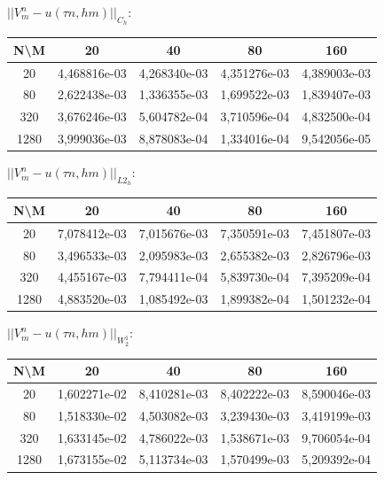 \documentclass[a4paper, 11pt]{article}
\begin{document}
$||V_m^n - u (\tau n, hm)||_{C_h}$:
\begin{center}
\begin{tabular}{|c|c|c|c|c|}
\hline 
 N\textbackslash M &      20      &      40      &      80      &     160      \\ 
 \hline 
        20         & 4,468816e-03 & 4,268340e-03 & 4,351276e-03 & 4,389003e-03 \\ 
 \hline 
        80         & 2,622438e-03 & 1,336355e-03 & 1,699522e-03 & 1,839407e-03 \\ 
 \hline 
        320        & 3,676246e-03 & 5,604782e-04 & 3,710596e-04 & 4,832500e-04 \\ 
 \hline 
       1280        & 3,999036e-03 & 8,878083e-04 & 1,334016e-04 & 9,542056e-05 \\ 
 \hline 
\end{tabular}
\end{center}
$||V_m^n - u (\tau n, hm)||_{L2_h}$:
\begin{center}
\begin{tabular}{|c|c|c|c|c|}
\hline 
 N\textbackslash M &      20      &      40      &      80      &     160      \\ 
 \hline 
        20         & 7,078412e-03 & 7,015676e-03 & 7,350591e-03 & 7,451807e-03 \\ 
 \hline 
        80         & 3,496533e-03 & 2,095983e-03 & 2,655382e-03 & 2,826796e-03 \\ 
 \hline 
        320        & 4,455167e-03 & 7,794411e-04 & 5,839730e-04 & 7,395209e-04 \\ 
 \hline 
       1280        & 4,883520e-03 & 1,085492e-03 & 1,899382e-04 & 1,501232e-04 \\ 
 \hline 
\end{tabular}
\end{center}
$||V_m^n - u (\tau n, hm)||_{W_2^1}$:
\begin{center}
\begin{tabular}{|c|c|c|c|c|}
\hline 
 N\textbackslash M &      20      &      40      &      80      &     160      \\ 
 \hline 
        20         & 1,602271e-02 & 8,410281e-03 & 8,402222e-03 & 8,590046e-03 \\ 
 \hline 
        80         & 1,518330e-02 & 4,503082e-03 & 3,239430e-03 & 3,419199e-03 \\ 
 \hline 
        320        & 1,633145e-02 & 4,786022e-03 & 1,538671e-03 & 9,706054e-04 \\ 
 \hline 
       1280        & 1,673155e-02 & 5,113734e-03 & 1,570499e-03 & 5,209392e-04 \\ 
 \hline 
\end{tabular}
\end{center}
\end{document}
